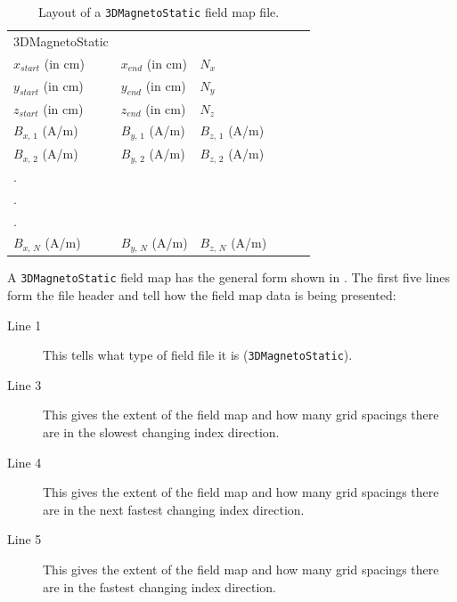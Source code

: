 \begin{table}[ht!]
    \caption{Layout of a \texttt{3DMagnetoStatic} field map file.}
    \label{tab:3DMagnetoStatic}
    \begin{center}
    \begin{tabular}{llllll}
      \hline
      3DMagnetoStatic     &                   &                   \\
      $x_{start}$ (in cm) & $x_{end}$ (in cm) & $N_{x}$           \\
      $y_{start}$ (in cm) & $y_{end}$ (in cm) & $N_{y}$           \\
      $z_{start}$ (in cm) & $z_{end}$ (in cm) & $N_{z}$           \\
      $B_{x,\,1}$ (A/m)   & $B_{y,\,1}$ (A/m) & $B_{z,\,1}$ (A/m) \\
      $B_{x,\,2}$ (A/m)   & $B_{y,\,2}$ (A/m) & $B_{z,\,2}$ (A/m) \\
      .                   &                   &                   \\
      .                   &                   &                   \\
      .                   &                   &                   \\
      $B_{x,\,N}$ (A/m)   & $B_{y,\,N}$ (A/m) & $B_{z,\,N}$ (A/m) \\
      \hline
    \end{tabular}
    \end{center}
\end{table}

A \texttt{3DMagnetoStatic} field map has the general form shown in . The first five lines form
the file header and tell \opalt how the field map data is being presented:

\begin{description}
\item[Line 1] This tells \opalt what type of field file it is (\texttt{3DMagnetoStatic}).
\item[Line 3] This gives the extent of the field map and how many grid spacings there are in the slowest changing
  index direction.
\item[Line 4] This gives the extent of the field map and how many grid spacings there are in the next fastest changing
  index direction.
\item[Line 5] This gives the extent of the field map and how many grid spacings there are in the fastest changing
  index direction.
\end{description}

